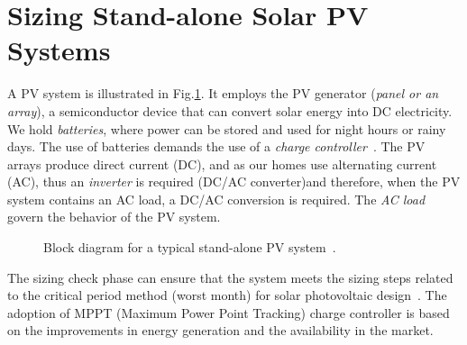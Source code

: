 \documentclass[a4paper,donotrepeattitle,fleqn]{cas-dc}
\begin{document}
\section{Sizing Stand-alone Solar PV Systems}
\label{sec:sizing}
A PV system is illustrated in Fig.\ref{fig:blockdiagram}. It employs the PV generator (\textit{panel or an array}), a semiconductor device that can convert solar energy into DC electricity. We hold \textit{batteries}, where power can be stored and used for night hours or rainy days. The use of batteries demands the use of a \textit{charge controller}~\cite{Hansen}. The PV arrays produce direct current (DC), and as our homes use alternating current (AC), thus an \textit{inverter} is required (DC/AC converter)and therefore, when the PV system contains an AC load, a DC/AC conversion is required. The \textit{AC load} govern the behavior of the PV system.
%
\begin{figure}[ht]
\centering
\caption{Block diagram for a typical stand-alone PV system~\cite{Hansen}.}
\label{fig:blockdiagram} 
\end{figure}
 

The sizing check phase can ensure that the system meets the sizing steps related to the critical period method (worst month) for solar photovoltaic design~\cite{Pinho}. The adoption of MPPT (Maximum Power Point Tracking) charge controller is based on the improvements in energy generation and the availability in the market. 
 
\end{document}
